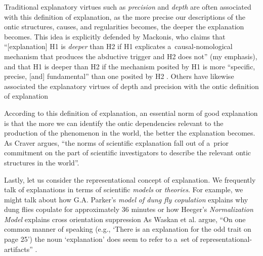 Traditional explanatory virtues such as \textit{precision} and \textit{depth} are often associated with this definition of explanation, as the more precise our descriptions of the ontic structures, causes, and regularities becomes, the deeper the explanation becomes. This idea is explicitly defended by Mackonis, who claims that ``[explanation] H1 is \textit{deeper} than H2 if H1 explicates a~causal-nomological mechanism that produces the abductive trigger and H2 does not'' (my emphasis), and that H1 is deeper than H2 if the mechanism posited by H1 is more ``specific, precise, [and] fundamental'' than one posited by H2
\parencite[][p.985]{mackonis_inference_2013}. %
 Others have likewise associated the explanatory virtues of depth and precision with the ontic definition of explanation 


According to this definition of explanation, an essential norm of good explanation is that the more we can identify the ontic dependencies relevant to the production of the phenomenon in the world, the better the explanation becomes. As Craver
\parencite*[][p.41]{kaiser_ontic_2014} %
 argues, ``the norms of scientific explanation fall out of a~prior commitment on the part of scientific investigators to describe the relevant ontic structures in the world''.

Lastly, let us consider the representational concept of explanation. We frequently talk of explanations in terms of scientific \textit{models} or \textit{theories}. For example, we might talk about how G.A. Parker's
\parencite*[][]{} %
 \textit{model} \textit{of dung fly copulation} explains why dung flies copulate for approximately 36 minutes 
 or how Heeger's 
\parencite*[][]{} %
 \textit{Normalization Model} explains cross orientation suppression 
 As Waskan et al. 
\parencite*[][p.3090]{izadi_building_2014} %
 argue, ``On one common manner of speaking (e.g., ‘There is an explanation for the odd trait on page 25') the noun ‘explanation' does seem to refer to a~set of representational-artifacts'' .

